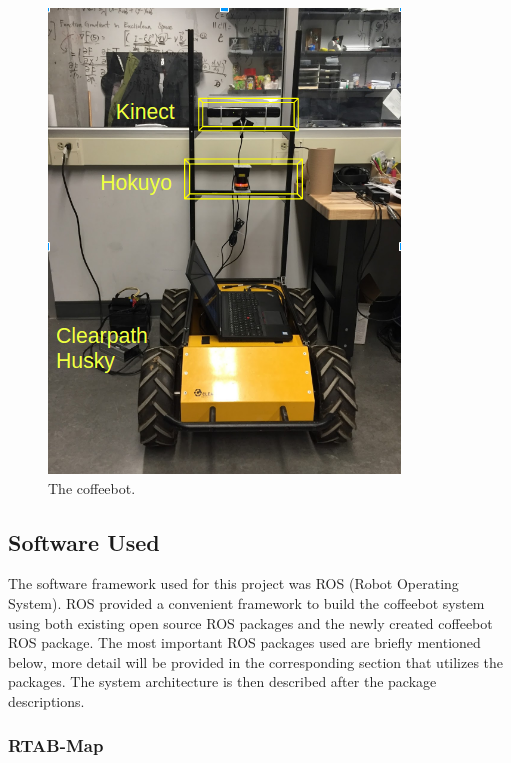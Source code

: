 \documentclass[letterpaper, 10 pt, conference]{ieeeconf}  %
\begin{document}
	\begin{figure}[!ht]
		\centering
		\includegraphics[width=1.0\columnwidth]{Figures/hardware_setup}
		\caption{The coffeebot.}
		\label{hardware}
	\end{figure}

\subsection{Software Used}

The software framework used for this project was ROS (Robot Operating System). ROS provided a convenient framework to build the coffeebot system using both existing open source ROS packages and the newly created coffeebot ROS package. The most important ROS packages used are briefly mentioned below, more detail will be provided in the corresponding section that utilizes the packages. The system architecture is then described after the package descriptions.

\subsubsection{RTAB-Map}
\end{document}
